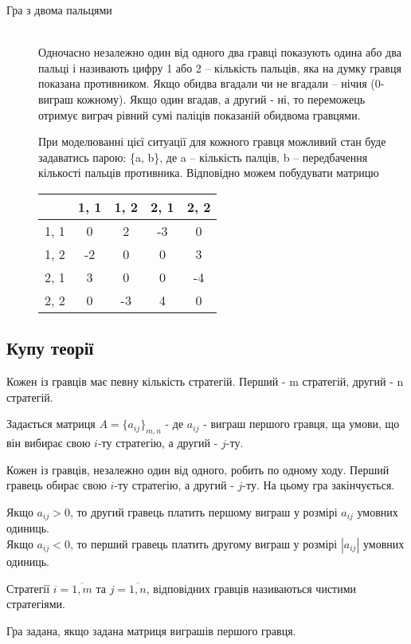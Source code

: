 \documentclass[12pt,a4paper]{report}
\begin{document}
\begin{description}
\item[Гра з двома пальцями] \hfill \\
Одночасно незалежно один від одного два гравці показують одина або два пальці і називають цифру 1 або 2 -- кількість пальців, яка на думку гравця показана противником. Якщо обидва вгадали чи не вгадали -- нічия (0-виграш кожному). Якщо один вгадав, а другий - ні, то переможець отримує виграч рівний сумі паліців показаній обидвома гравцями.

При моделюванні цієї ситуації для кожного гравця можливий стан буде задаватись парою: \{a, b\}, де a -- кількість палців, b -- передбачення кількості пальців противника.
Відповідно можем побудувати матрицю

\begin{tabular}{ r | c | c | c | c | }
         & 1, 1 & 1, 2 & 2, 1 & 2, 2 \\ \hline
  1, 1 & 0 & 2 & -3 & 0 \\ \hline
  1, 2 & -2 & 0 & 0 & 3 \\ \hline
  2, 1 & 3 & 0 & 0 & -4 \\ \hline
  2, 2 & 0 & -3 & 4 & 0 \\ \hline
\end{tabular}

\end{description}

\subsection*{Купу теорії}
Кожен із гравців має певну кількість стратегій. Перший - m стратегій, другий - n стратегій.

Задається матриця $A=\{a_{ij}\}_{m, n}$ - де $a_{ij}$ - виграш першого гравця, ща умови, що він вибирає свою $i$-ту стратегію, а другий - $j$-ту.

Кожен із гравців, незалежно один від одного, робить по одному ходу. Перший гравець обирає свою $i$-ту стратегію, а другий - $j$-ту. На цьому гра закінчується.

Якщо $a_{ij}>0$, то другий гравець платить першому виграш у розмірі $a_{ij}$ умовних одиниць.\\
Якщо $a_{ij}<0$, то перший гравець платить другому виграш у розмірі $|a_{ij}|$ умовних одиниць.

Стратегії $i=\overline{1, m}$ та $j=\overline{1, n}$, відповідних гравців називаються чистими стратегіями.

Гра задана, якщо задана матриця виграшів першого гравця.
\end{document}
